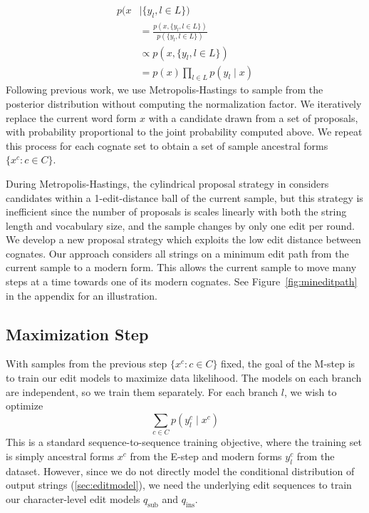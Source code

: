 \documentclass[11pt]{article}
\begin{document}
\begin{equation}
\begin{split}
p(x & \mid \{y_l, l \in L\}) \\ 
 & = \frac{p(x, \{y_l, l \in L\})}{p(\{y_l, l \in L\})} \\
 & \propto p(x, \{y_l, l \in L\}) \\
 & = p(x) \prod_{l \in L} p(y_l \mid x) 
\end{split}
\end{equation}
Following previous work, we use Metropolis-Hastings to sample from the posterior distribution without computing the normalization factor. We iteratively replace the current word form $x$ with a candidate drawn from a set of proposals, with probability proportional to the joint probability computed above. We repeat this process for each cognate set to obtain a set of sample ancestral forms $\{x^c: c \in C\}$.

During Metropolis-Hastings, the cylindrical proposal strategy in \citet{NIPS2008_1651cf0d} considers candidates within a 1-edit-distance ball of the current sample, but this strategy is inefficient since the number of proposals is scales linearly with both the string length and vocabulary size, and the sample changes by only one edit per round. We develop a new proposal strategy which exploits the low edit distance between cognates. Our approach considers all strings on a minimum edit path from the current sample to a modern form. This allows the current sample to move many steps at a time towards one of its modern cognates. 
See Figure~\ref{fig:mineditpath} in the appendix for an illustration.


\subsection{Maximization Step}
\label{sec:mstep}
With samples from the previous step $\{x^c: c \in C\}$ fixed, the goal of the M-step is to train our edit models to maximize data likelihood. The models on each branch are independent, so we train them separately. For each branch $l$, we wish to optimize
$$\sum_{c \in C} p(y_l^c \mid x^c)$$   
This is a standard sequence-to-sequence training objective, where the training set is simply ancestral forms $x^c$ from the E-step and modern forms $y_l^c$ from the dataset. However, since we do not directly model the conditional distribution of output strings (\ref{sec:editmodel}), we need the underlying edit sequences to train our character-level edit models $q_{\text{sub}}$ and $q_{\text{ins}}$. 
\end{document}
